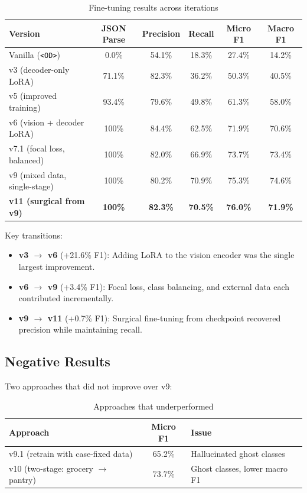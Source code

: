 \documentclass[11pt]{article}
\begin{document}
\begin{table}[h]
\centering
\caption{Fine-tuning results across iterations}
\label{tab:progression}
\begin{tabular}{lccccc}
\toprule
Version & JSON Parse & Precision & Recall & Micro F1 & Macro F1 \\
\midrule
Vanilla (\texttt{<OD>}) & 0.0\% & 54.1\% & 18.3\% & 27.4\% & 14.2\% \\
v3 (decoder-only LoRA) & 71.1\% & 82.3\% & 36.2\% & 50.3\% & 40.5\% \\
v5 (improved training) & 93.4\% & 79.6\% & 49.8\% & 61.3\% & 58.0\% \\
v6 (vision + decoder LoRA) & 100\% & 84.4\% & 62.5\% & 71.9\% & 70.6\% \\
v7.1 (focal loss, balanced) & 100\% & 82.0\% & 66.9\% & 73.7\% & 73.4\% \\
v9 (mixed data, single-stage) & 100\% & 80.2\% & 70.9\% & 75.3\% & 74.6\% \\
\textbf{v11 (surgical from v9)} & \textbf{100\%} & \textbf{82.3\%} & \textbf{70.5\%} & \textbf{76.0\%} & \textbf{71.9\%} \\
\bottomrule
\end{tabular}
\end{table}

Key transitions:
\begin{itemize}[nosep]
\item \textbf{v3 $\to$ v6} (+21.6\% F1): Adding LoRA to the vision encoder was the single largest improvement.
\item \textbf{v6 $\to$ v9} (+3.4\% F1): Focal loss, class balancing, and external data each contributed incrementally.
\item \textbf{v9 $\to$ v11} (+0.7\% F1): Surgical fine-tuning from checkpoint recovered precision while maintaining recall.
\end{itemize}

\subsection{Negative Results}

Two approaches that did not improve over v9:

\begin{table}[h]
\centering
\caption{Approaches that underperformed}
\begin{tabular}{lcl}
\toprule
Approach & Micro F1 & Issue \\
\midrule
v9.1 (retrain with case-fixed data) & 65.2\% & Hallucinated ghost classes \\
v10 (two-stage: grocery $\to$ pantry) & 73.7\% & Ghost classes, lower macro F1 \\
\bottomrule
\end{tabular}
\end{table}
\end{document}
